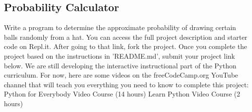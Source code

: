 \documentclass{article}%
\begin{document}
%
\subsection{Probability Calculator}%
\label{subsec:ProbabilityCalculator}%
Write a program to determine the approximate probability of drawing certain balls randomly from a hat.\newline%
You can access the full project description and starter code on Repl.it. After going to that link, fork the project. Once you complete the project based on the instructions in 'README.md', submit your project link below.\newline%
We are still developing the interactive instructional part of the Python curriculum. For now, here are some videos on the freeCodeCamp.org YouTube channel that will teach you everything you need to know to complete this project:\newline%
Python for Everybody Video Course (14 hours)\newline%
  \newline%
Learn Python Video Course (2 hours)\newline%
  \newline%

%
\newpage%
\end{document}
